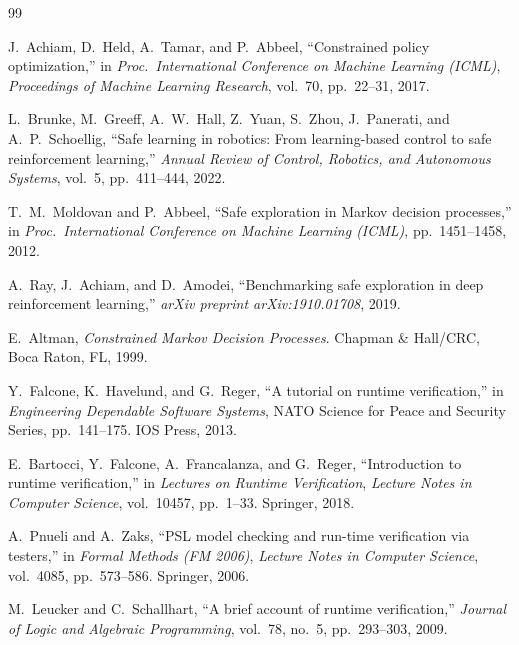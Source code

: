 \begin{thebibliography}{99}

J.~Achiam, D.~Held, A.~Tamar, and P.~Abbeel,
``Constrained policy optimization,''
in \emph{Proc.\ International Conference on Machine Learning (ICML)},
\emph{Proceedings of Machine Learning Research}, vol.~70, pp.~22--31, 2017.

L.~Brunke, M.~Greeff, A.~W.~Hall, Z.~Yuan, S.~Zhou, J.~Panerati, and A.~P.~Schoellig,
``Safe learning in robotics: From learning-based control to safe reinforcement learning,''
\emph{Annual Review of Control, Robotics, and Autonomous Systems}, vol.~5, pp.~411--444, 2022.

T.~M.~Moldovan and P.~Abbeel,
``Safe exploration in Markov decision processes,''
in \emph{Proc.\ International Conference on Machine Learning (ICML)}, pp.~1451--1458, 2012.

A.~Ray, J.~Achiam, and D.~Amodei,
``Benchmarking safe exploration in deep reinforcement learning,''
\emph{arXiv preprint arXiv:1910.01708}, 2019.

E.~Altman,
\emph{Constrained Markov Decision Processes}.
Chapman \& Hall/CRC, Boca Raton, FL, 1999.


Y.~Falcone, K.~Havelund, and G.~Reger,
``A tutorial on runtime verification,''
in \emph{Engineering Dependable Software Systems},
NATO Science for Peace and Security Series, pp.~141--175. IOS Press, 2013.

E.~Bartocci, Y.~Falcone, A.~Francalanza, and G.~Reger,
``Introduction to runtime verification,''
in \emph{Lectures on Runtime Verification}, \emph{Lecture Notes in Computer Science},
vol.~10457, pp.~1--33. Springer, 2018.

A.~Pnueli and A.~Zaks,
``PSL model checking and run-time verification via testers,''
in \emph{Formal Methods (FM 2006)}, \emph{Lecture Notes in Computer Science},
vol.~4085, pp.~573--586. Springer, 2006.

M.~Leucker and C.~Schallhart,
``A brief account of runtime verification,''
\emph{Journal of Logic and Algebraic Programming}, vol.~78, no.~5, pp.~293--303, 2009.


\end{thebibliography}

